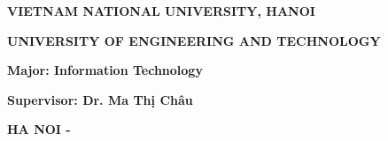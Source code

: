 \begin{center}\adddecorativeborder
    \thispagestyle{plain}

    {\large\textbf{VIETNAM NATIONAL UNIVERSITY, HANOI}\par}
    {\large\textbf{UNIVERSITY OF ENGINEERING AND TECHNOLOGY}\par}
    \vspace{1cm}

    {\Large\bfseries \AuthorName \par}

    \vspace{2cm}

    {\LARGE\bfseries\MakeUppercase{\ProjectName} \par}
    \vspace{0.5cm}
    {\large\bfseries \MakeUppercase{\ProjectNameEng} \par}

    \vspace{2cm}

    {\Large\bfseries Major: Information Technology\par}

    \vspace{3cm}

    \begin{flushleft}
        {\Large\bfseries Supervisor: Dr. Ma Thị Châu\par}
    \end{flushleft}

    \vspace{1.5cm}


    \vfill

    {\large\bfseries HA NOI - \the\year{} \par}
\end{center}